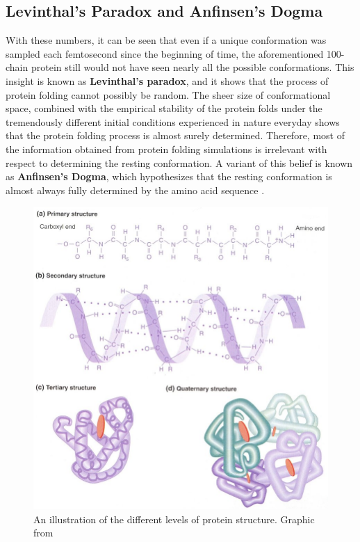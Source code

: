 \documentclass{article}
\begin{document}
\subsection{Levinthal's Paradox and Anfinsen's Dogma}
With these numbers, it can be seen that even if a unique conformation was sampled each femtosecond since the beginning of time, the aforementioned 100-chain protein still would not have seen nearly all the possible conformations. This insight is known as \textbf{Levinthal's paradox}, and it shows that the process of protein folding cannot possibly be random. The sheer size of conformational space, combined with the empirical stability of the protein folds under the tremendously different initial conditions experienced in nature everyday shows that the protein folding process is almost surely determined. Therefore, most of the information obtained from protein folding simulations is irrelevant with respect to determining the resting conformation. A variant of this belief is known as \textbf{Anfinsen's Dogma}, which hypothesizes that the resting conformation is almost always fully determined by the amino acid sequence \cite{anfinsen}.

\newpage 
\vfill
\begin{figure}[!h]
  \includegraphics[width=\linewidth]{images/protein_structure.png}
  \caption{An illustration of the different levels of protein structure. Graphic from \cite{genetic_analysis}}
  \label{fig:proteinStructure}
\end{figure}
\end{document}
